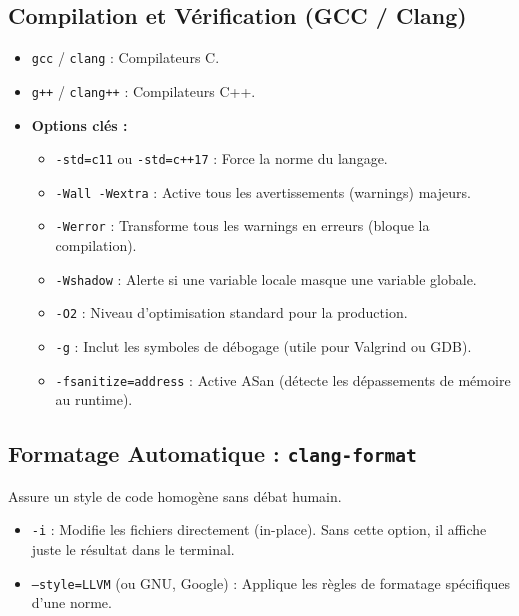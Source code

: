 \documentclass[11pt, a4paper]{report}
\begin{document}
\subsection{Compilation et Vérification (GCC / Clang)}
\begin{itemize}[leftmargin=1.5cm]
    \item \texttt{gcc} / \texttt{clang} : Compilateurs C.
    \item \texttt{g++} / \texttt{clang++} : Compilateurs C++.
    \item \textbf{Options clés :}
    \begin{itemize}
        \item \texttt{-std=c11} ou \texttt{-std=c++17} : Force la norme du langage.
        \item \texttt{-Wall -Wextra} : Active tous les avertissements (warnings) majeurs.
        \item \texttt{-Werror} : Transforme tous les warnings en erreurs (bloque la compilation).
        \item \texttt{-Wshadow} : Alerte si une variable locale masque une variable globale.
        \item \texttt{-O2} : Niveau d'optimisation standard pour la production.
        \item \texttt{-g} : Inclut les symboles de débogage (utile pour Valgrind ou GDB).
        \item \texttt{-fsanitize=address} : Active ASan (détecte les dépassements de mémoire au runtime).
    \end{itemize}
\end{itemize}

\subsection{Formatage Automatique : \texttt{clang-format}}
Assure un style de code homogène sans débat humain.
\begin{itemize}[leftmargin=1.5cm]
    \item \texttt{-i} : Modifie les fichiers directement (in-place). Sans cette option, il affiche juste le résultat dans le terminal.
    \item \texttt{--style=LLVM} (ou GNU, Google) : Applique les règles de formatage spécifiques d'une norme.
\end{itemize}
\end{document}

